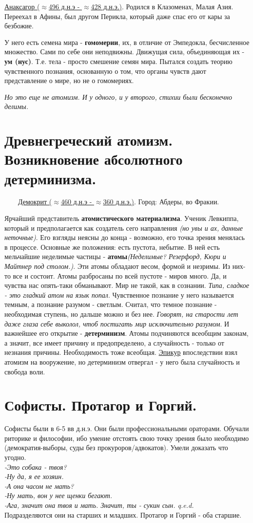\underline{Анаксагор ($\approx$496 д.н.э - $\approx$428 д.н.э.)}. Родился в Клазоменах, Малая Азия. Переехал в Афины, был другом Перикла, который даже спас его от кары за безбожие.

У него есть семена мира - \textbf{гомомерии}, их, в отличие от Эмпедокла, бесчисленное множество. Сами по себе они неподвижны. Движущая сила, объединяющая их - \textbf{ум (нус)}. Т.е. тела - просто смешение семян мира. Пытался создать теорию чувственного познания, основанную о том, что органы чувств дают представление о мире, но не о гомомериях. 

\textit{Но это еще не атомизм. И у одного, и у второго, стихии были бесконечно делимы.} 

\section{Древнегреческий атомизм. Возникновение абсолютного детерминизма.}
\ \ \ \
\underline{Демокрит ($\approx$460 д.н.э - $\approx$360 д.н.э.)}. Город: Абдеры, во Фракии.

Ярчайший представитель \textbf{атомистического материализма}.
Ученик Левкиппа, который и предполагается как создатель сего направления \textit{(но увы и ах, данные неточные)}.
Его взгляды неясны до конца - возможно, его точка зрения менялась в процессе. Основные же положения:
есть пустота, небытие. В ней есть мельчайшие неделимые частицы - \textbf{атомы}\textit{(Неделимые? Резерфорд, Кюри и Майтнер под столом.)}. Эти атомы обладают весом, формой и незримы. Из них-то все и состоит. Атомы разбросаны по всей пустоте - миров много. Да, и чувства нас опять-таки обманывают. Мир не такой, как в сознании. \textit{Типа, сладкое - это гладкий атом на язык попал}. Чувственное познание у него называется темным, а познание разумом - светлым. Считал, что темное познание - необходимая ступень, но дальше можно и без нее. \textit{Говорят, на старости лет даже глаза себе выколол, чтоб постигать мир исключительно разумом}. И важнейшее его открытие - \textbf{детерминизм}. Атомы подчиняются всеобщим законам, а значит, все имеет причину и предопределено, а случайность - только от незнания причины. Необходимость тоже всеобщая. \underline{Эпикур} впоследствии взял атомизм на вооружение, но детерминизм отвергал - у него была случайность и свобода воли.

\section{Софисты. Протагор и Горгий.}
Софисты были в 6-5 вв д.н.э. Они были профессиональными ораторами. Обучали риторике и философии, ибо умение отстоять свою точку зрения было необходимо (демократия-выборы, суды без прокуроров/адвокатов). Умели доказать что угодно.
\textit{\\-Это собака - твоя?\\ -Ну да, я ее хозяин.\\-А она часом не мать?\\-Ну мать, вон у нее щенки бегают.\\-Ага, значит она твоя и мать. Значит, ты - сукин сын. q.e.d.}\\
Подразделяются они на старших и младших. Протагор и Горгий - оба старшие.

